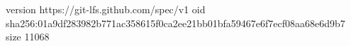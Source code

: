 version https://git-lfs.github.com/spec/v1
oid sha256:01a9df283982b771ac358615f0ca2ee21bb01bfa59467e6f7ecf08aa68e6d9b7
size 11068
